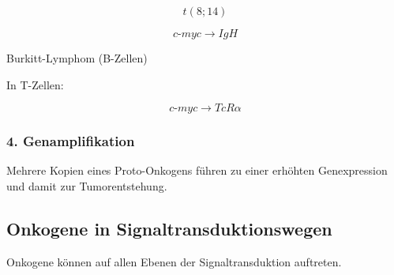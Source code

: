\[
    t(8;14)
\]

\[
    c\text{-}myc
    \longrightarrow
    IgH
\]

Burkitt-Lymphom
(B-Zellen)

\vspace{0.3cm}

In T-Zellen:

\[
    c\text{-}myc
    \longrightarrow
    TcR\alpha
\]


\subsubsection*{4. Genamplifikation}

Mehrere Kopien eines Proto-Onkogens
führen zu einer erhöhten Genexpression
und damit zur Tumorentstehung.



\subsection{Onkogene in Signaltransduktionswegen}\label{subsec:onkogene-in-signaltransduktionswegen}

Onkogene können auf allen Ebenen der Signaltransduktion auftreten.

